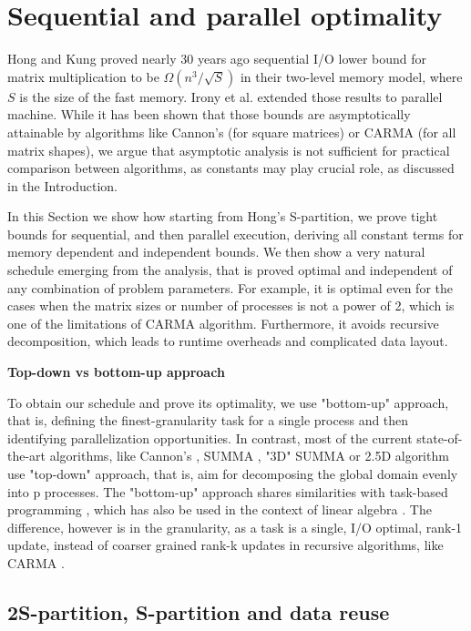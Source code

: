 \documentclass[sigconf]{acmart}
\begin{document}
\section{Sequential and parallel optimality}
	\label{sec:datareuse}
Hong and Kung \cite{redblue} proved nearly 30 years ago sequential I/O lower 
bound for matrix multiplication to be $\Omega(n^3/\sqrt{S})$ in their two-level 
memory model, where $S$ is the size of the fast memory. Irony et al. 
\cite{IronyMMM} extended those results to parallel machine. While it has been 
shown that those bounds are asymptotically attainable by algorithms like 
Cannon's \cite{Cannon} (for square matrices) or CARMA \cite{CARMA} (for all 
matrix shapes), we argue that asymptotic analysis is not sufficient for 
practical comparison between algorithms, as constants may play crucial role, as 
discussed in the Introduction.

In this Section we show how starting from Hong's S-partition, we prove tight 
bounds for sequential, and then parallel execution, deriving all constant terms 
for memory dependent and independent bounds. We then show a very natural 
schedule emerging from the analysis, that is proved optimal and independent of 
any combination of problem parameters. For example, it is optimal even for the 
cases when the matrix sizes or number of processes is not a power of 2, which 
is one of the limitations of CARMA algorithm. Furthermore, it avoids recursive 
decomposition, which leads to runtime overheads and complicated data layout.

\vspace{0.5cm}
\textbf{Top-down vs bottom-up approach}

To obtain our schedule and prove its optimality, we use "bottom-up" approach, 
that is, defining the finest-granularity task for a single process and then 
identifying parallelization opportunities. In contrast, most of the current 
state-of-the-art algorithms, like Cannon's \cite{Cannon}, SUMMA \cite{summa}, 
"3D" SUMMA \cite{summa3d} or 2.5D algorithm \cite{25d} use "top-down" approach, 
that is, aim for decomposing the global domain evenly into p processes. The 
"bottom-up" approach shares similarities with task-based programming 
\cite{taskparalelism}, which has also be used in the context of linear algebra 
\cite{taskMMM}. The difference, however is in the granularity, as a task is a 
single, I/O optimal, rank-1 update, instead of coarser grained rank-k updates 
in recursive algorithms, like CARMA \cite{CARMA}.

\subsection{2S-partition, S-partition and data reuse}
\end{document}
